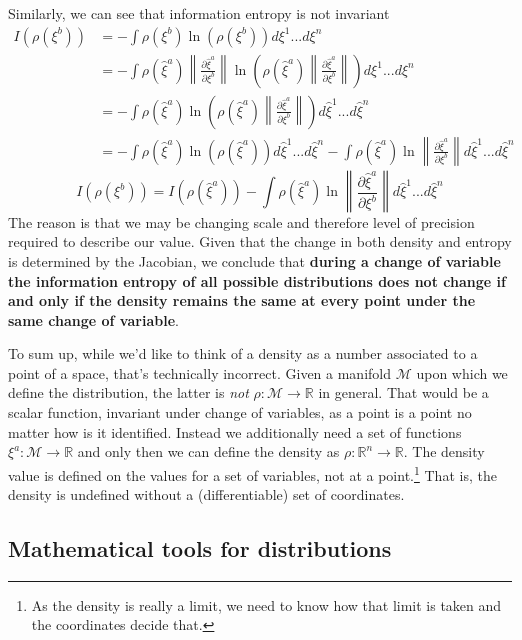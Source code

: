 \documentclass[11pt]{article}
\begin{document}
Similarly, we can see that information entropy is not invariant
\begin{align*}
I(\rho(\xi^b)) &=-\int \rho(\xi^b) \ln (\rho(\xi^b)) d\xi^1 ... d\xi^n \\
&=-\int \rho(\hat{\xi}^a) \left\|\frac{\partial \hat{\xi}^a}{\partial \xi^b}\right\| \ln \left(\rho(\hat{\xi}^a) \left\|\frac{\partial \hat{\xi}^a}{\partial \xi^b}\right\|\right) d\xi^1 ... d\xi^n \\
&=-\int \rho(\hat{\xi}^a) \ln \left(\rho(\hat{\xi}^a) \left\|\frac{\partial \hat{\xi}^a}{\partial \xi^b}\right\|\right) d\hat{\xi}^1 ... d\hat{\xi}^n \\
&=-\int \rho(\hat{\xi}^a) \ln (\rho(\hat{\xi}^a)) d\hat{\xi}^1 ... d\hat{\xi}^n -\int \rho(\hat{\xi}^a) \ln \left\|\frac{\partial \hat{\xi}^a}{\partial \xi^b}\right\| d\hat{\xi}^1 ... d\hat{\xi}^n
\end{align*}
\begin{equation}\label{entropy_transformation}
I(\rho(\xi^b)) =I(\rho(\hat{\xi}^a)) -\int \rho(\hat{\xi}^a) \ln \left\|\frac{\partial \hat{\xi}^a}{\partial \xi^b}\right\| d\hat{\xi}^1 ... d\hat{\xi}^n
\end{equation}
The reason is that we may be changing scale and therefore level of precision required to describe our value. Given that the change in both density and entropy is determined by the Jacobian, we conclude that \textbf{during a change of variable the information entropy of all possible distributions does not change if and only if the density remains the same at every point under the same change of variable}.

To sum up, while we'd like to think of a density as a number associated to a point of a space, that's technically incorrect. Given a manifold $\mathcal{M}$ upon which we define the distribution, the latter is \emph{not} $\rho : \mathcal{M} \to \mathbb{R}$ in general. That would be a scalar function, invariant under change of variables, as a point is a point no matter how is it identified. Instead we additionally need a set of functions $\xi^a : \mathcal{M} \to \mathbb{R}$ and only then we can define the density as $\rho : \mathbb{R}^n \to \mathbb{R}$. The density value is defined on the values for a set of variables, not at a point.\footnote{As the density is really a limit, we need to know how that limit is taken and the coordinates decide that.} That is, the density is undefined without a (differentiable) set of coordinates.

\subsection*{Mathematical tools for distributions}
\end{document}
